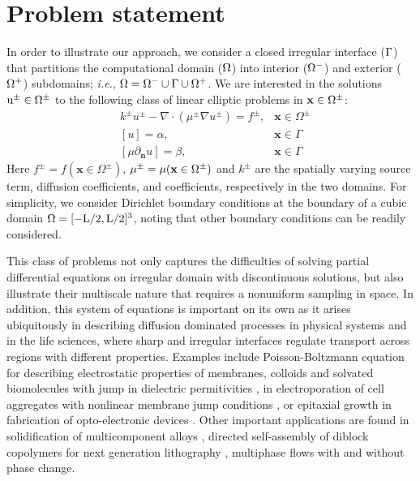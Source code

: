 \documentclass{article}
\begin{document}
\section{Problem statement}
In order to illustrate our approach, we consider a closed irregular interface ($\rm \Gamma$) that partitions the computational domain ($\rm \Omega$) into interior ($\rm \Omega^-$) and exterior ($\rm \Omega^+$) subdomains; \textit{i.e.}, $\rm \Omega=\Omega^- \cup \Gamma \cup \Omega^+$. We are interested in the solutions $\rm u^\pm\in \Omega^\pm$ to the following class of linear elliptic problems in  $\rm \mathbf{x}\in\Omega^\pm$:
\begin{align*}
	 & k^{\pm}u^{\pm} - \nabla \cdot (\mu^{\pm}\nabla u^\pm)=f^{\pm}, & \mathbf{x}\in\Omega^\pm \\
	 & [u]=\alpha,                                                    & \mathbf{x} \in \Gamma   \\
	 & [\mu \partial_{\mathbf{n}}u]=\beta,                            & \mathbf{x} \in \Gamma
\end{align*}
Here $f^\pm=f(\mathbf{x} \in \Omega^\pm)$, $\rm \mu^\pm=\mu(\mathbf{x} \in \Omega^\pm)$ and $k^\pm$ are the spatially varying source term, diffusion coefficients, and coefficients, respectively in the two domains. For simplicity, we consider Dirichlet boundary conditions at the boundary of a cubic domain $\rm \Omega=[-L/2,L/2]^3$, noting that other boundary conditions can be readily considered.


This class of problems not only captures the difficulties of solving partial differential equations on irregular domain with discontinuous solutions, but also illustrate their multiscale nature that requires a nonuniform sampling in space. In addition, this system of equations is important on its own as it arises ubiquitously in describing diffusion dominated processes in physical systems and in the life sciences, where sharp and irregular interfaces regulate transport across regions with different properties. Examples include Poisson-Boltzmann equation for describing electrostatic properties of membranes, colloids and solvated biomolecules with jump in dielectric permitivities \cite{sharp1990calculating,MirzadehPB}, in electroporation of cell aggregates with nonlinear membrane jump conditions \cite{mistani2019parallel}, or epitaxial growth in fabrication of opto-electronic devices \cite{MISTANI2018150}. Other important applications are found in solidification of multicomponent alloys \citep{theillard2015sharp,bochkov2021sharp}, directed self-assembly of diblock copolymers for next generation lithography \cite{galatsis2010patterning,ouaknin2018level,bochkov2021non}, multiphase flows with and without phase change. 
\end{document}
